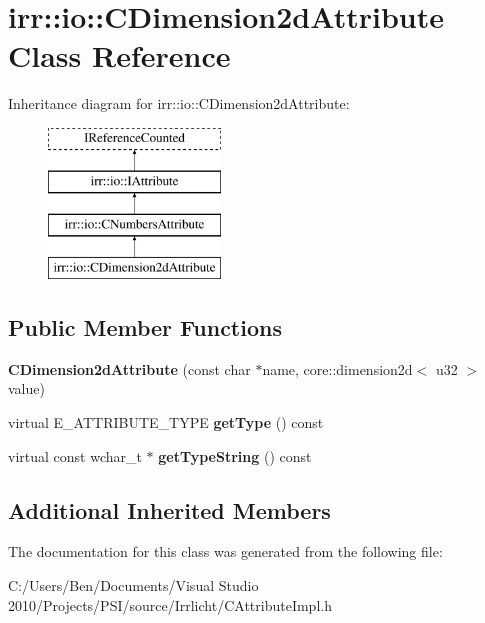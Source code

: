 \hypertarget{classirr_1_1io_1_1_c_dimension2d_attribute}{\section{irr\-:\-:io\-:\-:C\-Dimension2d\-Attribute Class Reference}
\label{classirr_1_1io_1_1_c_dimension2d_attribute}
}
Inheritance diagram for irr\-:\-:io\-:\-:C\-Dimension2d\-Attribute\-:\begin{figure}[H]
\begin{center}
\leavevmode
\includegraphics[height=4.000000cm]{classirr_1_1io_1_1_c_dimension2d_attribute}
\end{center}
\end{figure}
\subsection*{Public Member Functions}
\begin{DoxyCompactItemize}
\item 
\hypertarget{classirr_1_1io_1_1_c_dimension2d_attribute_a1ea67f0cf6aba1b4ecf704f555556682}{{\bfseries C\-Dimension2d\-Attribute} (const char $\ast$name, core\-::dimension2d$<$ u32 $>$ value)}\label{classirr_1_1io_1_1_c_dimension2d_attribute_a1ea67f0cf6aba1b4ecf704f555556682}

\item 
\hypertarget{classirr_1_1io_1_1_c_dimension2d_attribute_a45e50775200d9ee0f6e1128cf545c59e}{virtual E\-\_\-\-A\-T\-T\-R\-I\-B\-U\-T\-E\-\_\-\-T\-Y\-P\-E {\bfseries get\-Type} () const }\label{classirr_1_1io_1_1_c_dimension2d_attribute_a45e50775200d9ee0f6e1128cf545c59e}

\item 
\hypertarget{classirr_1_1io_1_1_c_dimension2d_attribute_a5eb370cd7ceb647f28780403ee38975f}{virtual const wchar\-\_\-t $\ast$ {\bfseries get\-Type\-String} () const }\label{classirr_1_1io_1_1_c_dimension2d_attribute_a5eb370cd7ceb647f28780403ee38975f}

\end{DoxyCompactItemize}
\subsection*{Additional Inherited Members}


The documentation for this class was generated from the following file\-:\begin{DoxyCompactItemize}
\item 
C\-:/\-Users/\-Ben/\-Documents/\-Visual Studio 2010/\-Projects/\-P\-S\-I/source/\-Irrlicht/C\-Attribute\-Impl.\-h\end{DoxyCompactItemize}
